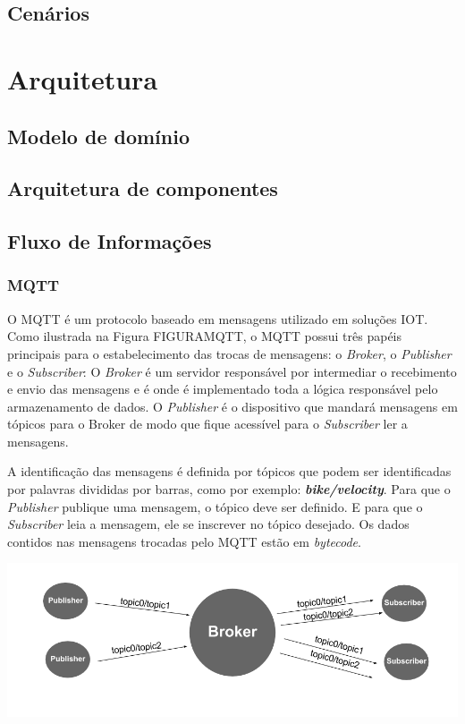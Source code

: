 \subsection{Cenários}

\section{Arquitetura}

\subsection{Modelo de domínio}

\subsection{Arquitetura de componentes}

\subsection{Fluxo de Informa\c{c}ões}
\subsubsection{MQTT}

	O MQTT é um protocolo baseado em mensagens utilizado em soluções IOT. Como ilustrada na Figura FIGURAMQTT, o MQTT possui três papéis principais para o estabelecimento das trocas de mensagens: o \textit{Broker}, o \textit{Publisher} e o \textit{Subscriber}: O \textit{Broker} é um servidor responsável por intermediar o recebimento e envio das mensagens e é onde é implementado toda a lógica responsável pelo armazenamento de dados. O \textit{Publisher} é o dispositivo que mandará mensagens em tópicos para o Broker de modo que fique acessível para o \textit{Subscriber} ler a mensagens.
    
	A identificação das mensagens é definida por tópicos que podem ser identificadas por palavras divididas por barras, como por exemplo: \textit{\textbf{bike/velocity}}. Para que o \textit{Publisher} publique uma mensagem, o tópico deve ser definido. E para que o \textit{Subscriber} leia a mensagem, ele se inscrever no tópico desejado. Os dados contidos nas mensagens trocadas pelo MQTT estão em \textit{bytecode}.
    
\begin{center}
	\label{mqtt}
	\includegraphics[scale=0.4]{figuras/MQTT}
\end{center} 


